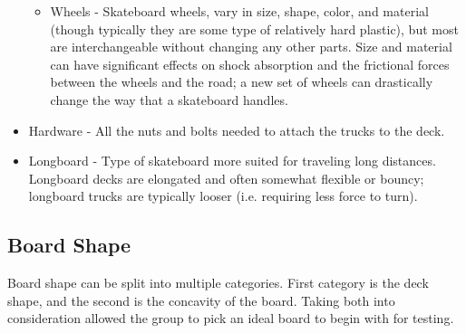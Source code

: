\documentclass[titlepage, letterpaper,12pt]{article}
\begin{document}
\begin{itemize}
\begin{itemize}
\item Wheels - Skateboard wheels, vary in size, shape, color, and material (though typically they are some type of relatively hard plastic), but most are interchangeable without changing any other parts. Size and material can have significant effects on shock absorption and the frictional forces between the wheels and the road; a new set of wheels can drastically change the way that a skateboard handles.
\end{itemize}
\item Hardware - All the nuts and bolts needed to attach the trucks to the deck.
\item Longboard - Type of skateboard more suited for traveling long distances. Longboard decks are elongated and often somewhat flexible or bouncy; longboard trucks are typically looser (i.e. requiring less force to turn).
\end{itemize}

\subsection{Board Shape}
Board shape can be split into multiple categories. First category is the deck shape, and the second is the concavity of the board. Taking both into consideration allowed the group to pick an ideal board to begin with for testing.
\end{document}
